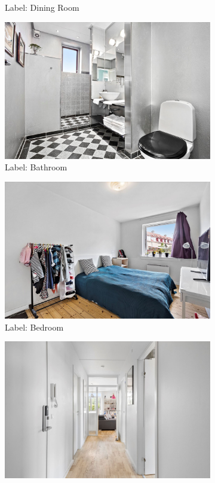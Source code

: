\begin{figure}[H]
\begin{subfigure}[b]{0.3\textwidth}
      \caption{Label: Dining Room}
      \label{fig:3}
    \end{subfigure}
    \begin{subfigure}[b]{0.3\textwidth}
      \includegraphics[width=\textwidth]{pictures/random/bathroom}
      \caption{Label: Bathroom}
      \label{fig:4}
    \end{subfigure}
    \begin{subfigure}[b]{0.3\textwidth}
      \includegraphics[width=\textwidth]{pictures/random/bedroom}
      \caption{Label: Bedroom}
      \label{fig:4}
    \end{subfigure}
    \begin{subfigure}[b]{0.3\textwidth}
      \includegraphics[width=\textwidth]{pictures/random/entre}

\end{subfigure}
\end{figure}

